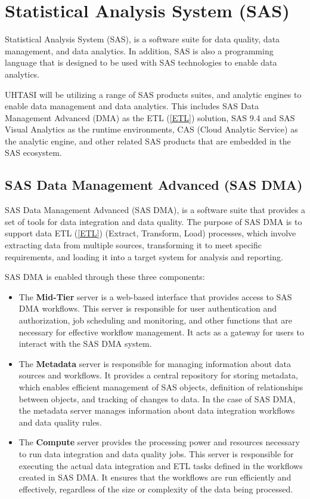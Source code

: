 \section{Statistical Analysis System (SAS)} \label{section: SAS}
Statistical Analysis System (SAS), is a software suite for data quality, data management, and data analytics. In addition, SAS is also a programming language that is designed to be used with SAS technologies to enable data analytics.

UHTASI will be utilizing a range of SAS products suites, and analytic engines to enable data management and data analytics. This includes SAS Data Management Advanced (DMA) as the ETL (\ref{ETL}) solution, SAS 9.4 and SAS Visual Analytics as the runtime environments, CAS (Cloud Analytic Service) as the analytic engine, and other related SAS products that are embedded in the SAS ecosystem.

\subsection{SAS Data Management Advanced (SAS DMA)} \label{5.1}
SAS Data Management Advanced (SAS DMA), is a software suite that provides a set of tools for data integration and data quality. The purpose of SAS DMA is to support data ETL (\ref{ETL}) (Extract, Transform, Load) processes, which involve extracting data from multiple sources, transforming it to meet specific requirements, and loading it into a target system for analysis and reporting. 

SAS DMA is enabled through these three components:

\begin{itemize}
    \item The \textbf{Mid-Tier} server is a web-based interface that provides access to SAS DMA workflows. This server is responsible for user authentication and authorization, job scheduling and monitoring, and other functions that are necessary for effective workflow management. It acts as a gateway for users to interact with the SAS DMA system.
    \item The \textbf{Metadata} server is responsible for managing information about data sources and workflows. It provides a central repository for storing metadata, which enables efficient management of SAS objects, definition of relationships between objects, and tracking of changes to data. In the case of SAS DMA, the metadata server manages information about data integration workflows and data quality rules.
    \item The \textbf{Compute} server provides the processing power and resources necessary to run data integration and data quality jobs. This server is responsible for executing the actual data integration and ETL tasks defined in the workflows created in SAS DMA. It ensures that the workflows are run efficiently and effectively, regardless of the size or complexity of the data being processed.
\end{itemize}

